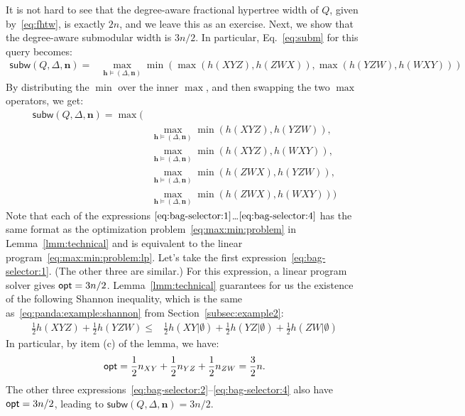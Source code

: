\documentclass{theoretics}
\newcommand{\opt}{\text{\sf opt}}
\newcommand{\subm}{\textsf{subw}}
\begin{document}
    It is not hard to see that the degree-aware fractional hypertree width of $Q$, given by~\eqref{eq:fhtw}, is exactly $2 n$, and we leave this as an exercise. Next, we show that the degree-aware submodular width is $3n/2$. In particular, Eq.~\eqref{eq:subm} for this query becomes:
    \begin{align*}
        \subm(Q, \Delta, \bm n) = & \max_{\bm h\models (\Delta, \bm n)}
        \min(\max(h(XYZ),h(ZWX)), \max(h(YZW), h(WXY)))
    \end{align*}
    By distributing the $\min$ over the inner $\max$, and then swapping the two $\max$ operators, we get:
    \begin{align}
        \subm(Q, \Delta, \bm n) = \max(&\nonumber\\
            & \max_{\bm h \models (\Delta, \bm n)} \min(h(XYZ), h(YZW)), \label{eq:bag-selector:1}\\
            & \max_{\bm h \models (\Delta, \bm n)} \min(h(XYZ), h(WXY)), \label{eq:bag-selector:2}\\
            & \max_{\bm h \models (\Delta, \bm n)} \min(h(ZWX), h(YZW)), \label{eq:bag-selector:3}\\
            & \max_{\bm h \models (\Delta, \bm n)} \min(h(ZWX), h(WXY))) \label{eq:bag-selector:4}
    \end{align}
    Note that each of the expressions $\eqref{eq:bag-selector:1}$\ldots$\eqref{eq:bag-selector:4}$
    has the same format as the optimization problem~\eqref{eq:max:min:problem} in Lemma~\ref{lmm:technical} and is equivalent to the linear program~\eqref{eq:max:min:problem:lp}.
    Let's take the first expression~\eqref{eq:bag-selector:1}. (The other three are similar.)
    For this expression, a linear program solver gives $\opt = 3n/2$. Lemma~\eqref{lmm:technical} guarantees for us the existence of the following Shannon inequality, which is the same as~\eqref{eq:panda:example:shannon} from Section~\ref{subsec:example2}:
    \begin{align*}
        \frac 1 2 h(XYZ) + \frac 1 2 h(YZW) \leq & \frac 1 2 h(XY|\emptyset)+\frac 1 2 h(YZ|\emptyset)+\frac 1 2 h(ZW|\emptyset)
      \end{align*}
      In particular, by item (c) of the lemma, we have:
      \[
        \opt = \frac{1}{2} n_{XY} + \frac{1}{2} n_{YZ} + \frac{1}{2} n_{ZW} = \frac{3}{2} n.
      \]
    The other three expressions~\eqref{eq:bag-selector:2}--\eqref{eq:bag-selector:4} also have
    $\opt = 3 n/2$, leading to $\subm(Q, \Delta, \bm n) = 3 n/ 2$.
\end{document}

